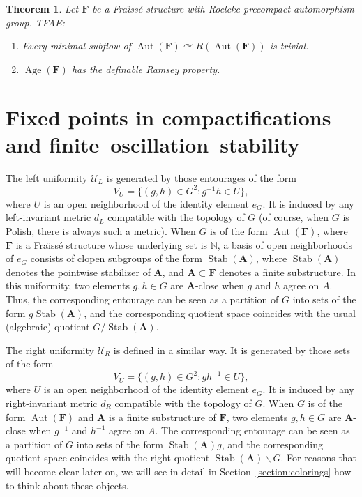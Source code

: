 \documentclass[11pt]{article}
\newtheorem{theo}{Theorem}[section]
\theoremstyle{definition}
\numberwithin{equation}{section}
\numberwithin{figure}{section}
\numberwithin{table}{section}
\newcommand{\N}{\mathbb{N}}
\newcommand*{\mA}{\mathbf{A}}
\newcommand*{\mF}{\mathbf{F}}
\DeclareMathOperator{\Aut}{Aut}
\DeclareMathOperator{\Stab}{Stab}
\DeclareMathOperator{\Age}{Age}
\newcommand{\actson}{\curvearrowright}
\begin{document}
\begin{theo}\label{thm:minRoeckeDefRP}
Let $\mF$ be a Fra\"{\i}ss\'e structure with Roelcke-precompact automorphism group. TFAE:
\begin{enumerate}
\item Every minimal subflow of $\Aut(\mF)\actson R(\Aut(\mF))$ is trivial.
\item $\Age(\mF)$ has the definable Ramsey property.
\end{enumerate}
\end{theo}

\section{Fixed points in compactifications and finite~oscillation~stability}
\label{section:oscillationstability}

The left uniformity $\mathcal U_{L}$ is generated by those entourages of the form
\[
V_{U}=\{ (g,h)\in G^{2}: g^{-1}h\in U\},
\]
where $U$ is an open neighborhood of the identity element $e_{G}$. It is induced by any left-invariant metric $d_{L}$ compatible with the topology of $G$ (of course, when $G$ is Polish, there is always such a metric). When $G$ is of the form $\Aut(\mF)$, where $\mF$ is a Fra\"{\i}ss\'e structure whose underlying set is $\N$, a basis of open neighborhoods of $e_{G}$ consists of clopen subgroups of the form $\Stab(\mA)$, where $\Stab(\mA)$ denotes the pointwise stabilizer of $\mA$, and $\mA\subset \mF$ denotes a finite substructure. In this uniformity, two elements $g, h\in G$ are $\mA$-close when $g$ and $h$ agree on $A$. Thus, the corresponding entourage can be seen as a partition of $G$ into sets of the form $g\Stab(\mA)$, and the corresponding quotient space coincides with the usual (algebraic) quotient $G/\Stab(\mA)$.

The right uniformity $\mathcal U_{R}$ is defined in a similar way. It is generated by those sets of the form
\[
V_{U}=\{ (g,h)\in G^{2}: gh^{-1}\in U\},
\]
where $U$ is an open neighborhood of the identity element $e_{G}$. It is induced by any right-invariant metric $d_{R}$ compatible with the topology of $G$. When $G$ is of the form $\Aut(\mF)$ and $\mA$ is a finite substructure of $\mF$, two elements $g, h\in G$ are $\mA$-close when $g^{-1}$ and $h^{-1}$ agree on $A$. The corresponding entourage can be seen as a partition of $G$ into sets of the form $\Stab(\mA)g$, and the corresponding quotient space coincides with the right quotient $\Stab(\mA)\backslash G$. For reasons that will become clear later on, we will see in detail in Section~\ref{section:colorings} how to think about these objects.
\end{document}
